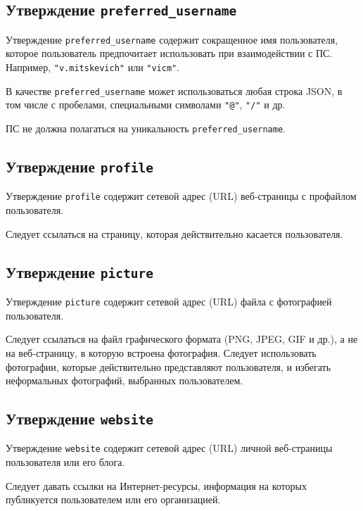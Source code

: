 \subsection{Утверждение \lstinline{preferred_username}}
\label{CLAIMS.PreferredUsername} 

Утверждение \lstinline{preferred_username} содержит сокращенное имя 
пользователя, которое пользователь предпочитает использовать при взаимодействии 
с ПС. Например, \lstinline{"v.mitskevich"} или \lstinline{"vicm"}.

В качестве \lstinline{preferred_username} может использоваться любая 
строка JSON, в том числе с пробелами, специальными символами 
\lstinline{"@"}, \lstinline{"/"} и др.

ПС не должна полагаться на уникальность \lstinline{preferred_username}.

\subsection{Утверждение \lstinline{profile}}\label{CLAIMS.Profile}

Утверждение \lstinline{profile} содержит сетевой адрес (URL) веб-страницы
с профайлом пользователя. 

Следует ссылаться на страницу, которая действительно касается пользователя.

\subsection{Утверждение \lstinline{picture}}\label{CLAIMS.Picture}

Утверждение \lstinline{picture} содержит сетевой адрес (URL) файла с
фотографией пользователя.

Следует ссылаться на файл графического формата (PNG, JPEG, GIF и др.),
а не на веб-страницу, в которую встроена фотография.
%
Следует использовать фотографии, которые действительно представляют 
пользователя, и избегать неформальных фотографий, выбранных пользователем.

\subsection{Утверждение \lstinline{website}}\label{CLAIMS.Website}

Утверждение \lstinline{website} содержит сетевой адрес (URL) личной 
веб-страницы пользователя или его блога.

Следует давать ссылки на Интернет-ресурсы, информация на которых публикуется 
пользователем или его организацией.

